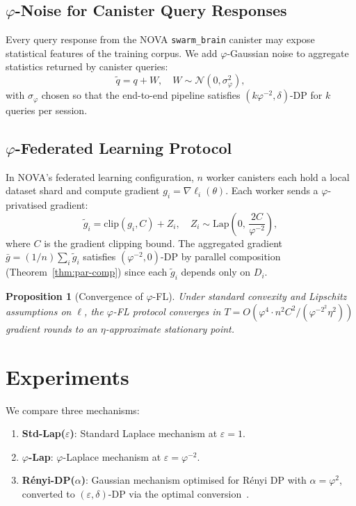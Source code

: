\documentclass[12pt]{article}
\newtheorem{proposition}[theorem]{Proposition}
\newcommand{\AMOR}{\varphi^{-2}}
\newcommand{\PHI}{\varphi}
\newcommand{\Lap}{\mathrm{Lap}}
\newcommand{\Gauss}{\mathcal{N}}
\newcommand{\eps}{\varepsilon}
\begin{document}
\subsection{$\varphi$-Noise for Canister Query Responses}

Every query response from the NOVA \texttt{swarm\_brain} canister may expose
statistical features of the training corpus.  We add $\varphi$-Gaussian noise
to aggregate statistics returned by canister queries:
\[
  \tilde{q} = q + W, \quad W \sim \Gauss(0, \sigma_\PHI^2),
\]
with $\sigma_\PHI$ chosen so that the end-to-end pipeline satisfies
$(k\AMOR, \delta)$-DP for $k$ queries per session.

\subsection{$\varphi$-Federated Learning Protocol}

In NOVA's federated learning configuration, $n$ worker canisters each hold a
local dataset shard and compute gradient $g_i = \nabla \ell_i(\theta)$.  Each
worker sends a $\varphi$-privatised gradient:
\[
  \tilde{g}_i = \mathrm{clip}(g_i, C) + Z_i, \quad Z_i \sim \Lap\!\left(0,\,
  \frac{2C}{\AMOR}\right),
\]
where $C$ is the gradient clipping bound.  The aggregated gradient $\bar{g} =
(1/n)\sum_i \tilde{g}_i$ satisfies $(\AMOR, 0)$-DP by parallel composition
(Theorem~\ref{thm:par-comp}) since each $\tilde{g}_i$ depends only on $D_i$.

\begin{proposition}[Convergence of $\varphi$-FL]
Under standard convexity and Lipschitz assumptions on $\ell$, the $\varphi$-FL
protocol converges in $T = O(\PHI^4 \cdot n^2 C^2 / (\AMOR^2 \eta^2))$
gradient rounds to an $\eta$-approximate stationary point.
\end{proposition}

\section{Experiments}
\label{sec:experiments}

We compare three mechanisms:
\begin{enumerate}[label=(\alph*)]
  \item \textbf{Std-Lap($\eps$)}: Standard Laplace mechanism at $\eps = 1$.
  \item \textbf{$\varphi$-Lap}: $\varphi$-Laplace mechanism at $\eps = \AMOR$.
  \item \textbf{Rényi-DP($\alpha$)}: Gaussian mechanism optimised for Rényi DP
        with $\alpha = \PHI^2$, converted to $(\eps, \delta)$-DP via the
        optimal conversion~\cite{Balle2020}.
\end{enumerate}
\end{document}
